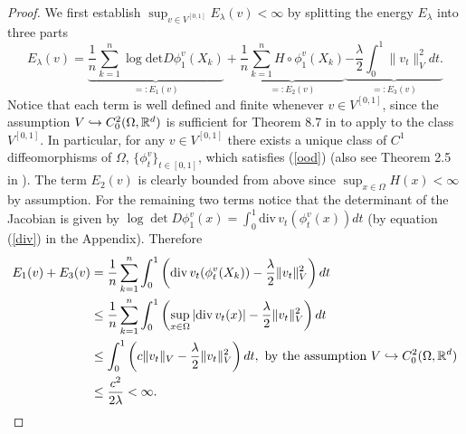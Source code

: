 \documentclass[noinfoline]{imsart}
\begin{document}
\begin{proof} 



We first establish $\sup_{v\in V^{[0,1]}}E_\lambda(v)<\infty$ by splitting the energy $E_\lambda$ into three parts
\begin{equation}
\label{decomp}
E_\lambda(v)=\underbrace{\frac{1}{n}\sum_{k=1}^n   \log\text{det} D\phi_1^v(X_k) }_{=:E_1(v)}+ \underbrace{\frac{1}{n}\sum_{k=1}^n H\circ\phi_1^v(X_k)}_{=:E_2(v)}  \underbrace{-\frac{\lambda}{2} \int_0^1 \| v_t \|_V^2 dt.}_{=:E_3(v)}  
\end{equation}
Notice that each term is well defined and finite whenever $v\in V^{[0,1]}$, since
the assumption $V\hookrightarrow C_0^2(\Omega, \Bbb R^d)$ is sufficient for  Theorem 8.7   in \cite{you:10} to apply to the class  $ V^{[0,1]}$. In particular, for any  $v\in V^{[0,1]}$  there exists a unique class of $C^1$ diffeomorphisms of $\Omega$, $\{\phi_t^v\}_{t\in [0,1]}$, which satisfies (\ref{ood}) (also see Theorem 2.5 in \cite{dup:98}). 
The term $E_2(v)$ is clearly bounded from above since  $\sup_{x\in\Omega}H(x)<\infty$ by assumption.
For the remaining two terms notice that  the determinant of the Jacobian is given by   $ \log\det D\phi_1^v(x)  = \int_0^1  \text{div}\,  v_t (\phi_t^v(x))dt$ (by equation (\ref{div}) in the Appendix).
Therefore
\begin{align}
E_1(v) + E_3(v) & = \frac{1}{n}\sum_{k=1}^n   \int_0^1 \left(  \text{div}\,  v_t (\phi_t^v(X_k))  - \frac{\lambda}{2}   \| v_t \|_V^2
\right)dt \nonumber\\
 & \leq \frac{1}{n}\sum_{k=1}^n   \int_0^1 \left( \sup_{x\in \Omega} |\text{div}\,  v_t (x)|  - \frac{\lambda}{2}   \| v_t \|_V^2
\right)dt \nonumber \\
 & \leq    \int_0^1 \left( c\| v_t \|_V  - \frac{\lambda}{2}   \| v_t \|_V^2
\right)dt, \,\,\text{by the assumption $V\hookrightarrow C_0^2(\Omega, \Bbb R^d)$} \nonumber \\
& \leq \frac{c^2}{2\lambda}<\infty. \nonumber
\end{align}


\end{proof}
\end{document}

